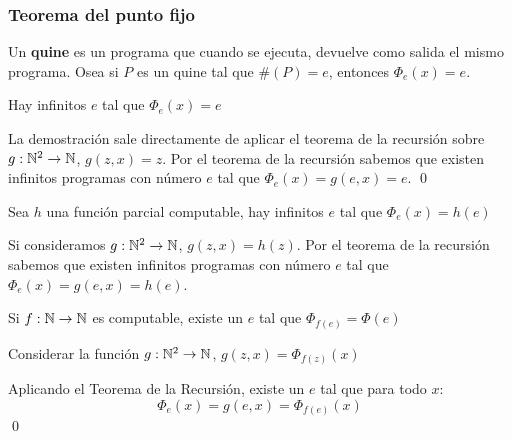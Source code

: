 \subsubsection{Teorema del punto fijo}
Un \textbf{quine} es un programa que cuando se ejecuta, devuelve como salida el mismo programa. Osea si $P$ es un quine tal que $\#(P) = e$, entonces $\Phi_e(x) = e$.

\begin{proposicion}
	Hay infinitos $e$ tal que $\Phi_e(x) = e$
\end{proposicion}

\begin{demo}
	La demostración sale directamente de aplicar el teorema de la recursión sobre $g:\mathbb{N}^2\to\mathbb{N}$, $g(z,x) = z$. Por el teorema de la recursión sabemos que existen infinitos programas con número $e$ tal que $\Phi_e(x) = g(e,x) = e$. \qed
\end{demo}

\begin{proposicion}
	Sea $h$ una función parcial computable, hay infinitos $e$ tal que $\Phi_e(x) = h(e)$
\end{proposicion}
\begin{demo}
	Si consideramos $g:\mathbb{N}^2\to\mathbb{N}$, $g(z,x) = h(z)$. Por el teorema de la recursión sabemos que existen infinitos programas con número $e$ tal que $\Phi_e(x) = g(e,x) = h(e)$.
\end{demo}

\begin{teorema}
	Si $f:\mathbb{N}\to\mathbb{N}$ es computable, existe un $e$ tal que $\Phi_{f(e)} = \Phi(e)$
\end{teorema}

\begin{demo}
	Considerar la función $g:\mathbb{N}^2\to\mathbb{N}$, $g(z,x) = \Phi_{f(z)}(x)$
	
	Aplicando el Teorema de la Recursión, existe un $e$ tal que para todo $x$:
	$$\Phi_e(x) = g(e,x) = \Phi_{f(e)}(x)$$ \qed
\end{demo}